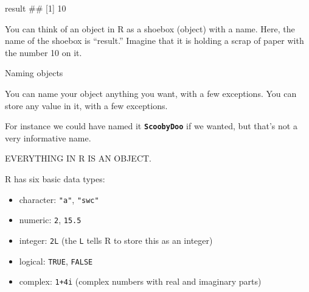 \documentclass[ignorenonframetext,]{beamer}
\newenvironment{Shaded}{\begin{snugshade}}{\end{snugshade}}
\newcommand{\NormalTok}[1]{#1}
\providecommand{\tightlist}{%
  \setlength{\itemsep}{0pt}\setlength{\parskip}{0pt}}
\begin{document}
\begin{frame}[fragile]

\begin{Shaded}
\begin{Highlighting}[]
\NormalTok{result}
\NormalTok{## [1] 10}
\end{Highlighting}
\end{Shaded}

You can think of an object in R as a shoebox (object) with a name. Here,
the name of the shoebox is ``result.'' Imagine that it is holding a
scrap of paper with the number 10 on it.

\end{frame}

\begin{frame}[fragile]

\begin{block}{Naming objects}

You can name your object anything you want, with a few exceptions. You
can store any value in it, with a few exceptions.

For instance we could have named it \textbf{\texttt{ScoobyDoo}} if we
wanted, but that's not a very informative name.

\end{block}

\end{frame}

\begin{frame}{EVERYTHING IN R IS AN OBJECT.}

\end{frame}

\begin{frame}[fragile]

\begin{block}{R has six basic data types:}

\begin{itemize}[<+->]
\tightlist
\item
  character: \texttt{"a"}, \texttt{"swc"}
\item
  numeric: \texttt{2}, \texttt{15.5}
\item
  integer: \texttt{2L} (the \texttt{L} tells R to store this as an
  integer)
\item
  logical: \texttt{TRUE}, \texttt{FALSE}
\item
  complex: \texttt{1+4i} (complex numbers with real and imaginary parts)
\end{itemize}

\end{block}

\end{frame}
\end{document}
